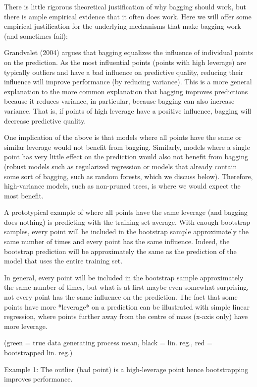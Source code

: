 There is little rigorous theoretical justification of why bagging should work, but there is ample empirical evidence that it often does work. Here we will offer some empirical justification for the underlying mechanisms that make bagging work (and sometimes fail):

Grandvalet (2004) argues that bagging equalizes the influence of individual points on the prediction. As the most influential points (points with high leverage) are typically outliers and have a bad influence on predictive quality, reducing their influence will improve performance (by reducing variance). This is a more general explanation to the more common explanation that bagging improves predictions because it reduces variance, in particular, because bagging can also increase variance. That is, if points of high leverage have a positive influence, bagging will decrease predictive quality.

One implication of the above is that models where all points have the same or similar leverage would not benefit from bagging. Similarly, models where a single point has very little effect on the prediction would also not benefit from bagging (robust models such as regularized regression or models that already contain some sort of bagging, such as random forests, which we discuss below). Therefore, high-variance models, such as non-pruned trees, is where we would expect the most benefit.


A prototypical example of where all points have the same leverage (and bagging does nothing) is predicting with the training set average. With enough bootstrap samples, every point will be included in the bootstrap sample approximately the same number of times and every point has the same influence. Indeed, the bootstrap prediction will be approximately the same as the prediction of the model that uses the entire training set.

In general, every point will be included in the bootstrap sample approximately the same number of times, but what is at first maybe even somewhat surprising, not every point has the same influence on the prediction. The fact that some points have more *leverage* on a prediction can be illustrated with simple linear regression, where points further away from the centre of mass (x-axis only) have more leverage. 

(green = true data generating process mean, black = lin. reg., red = bootstrapped lin. reg.)

Example 1: The outlier (bad point) is a high-leverage point hence bootstrapping improves performance.

